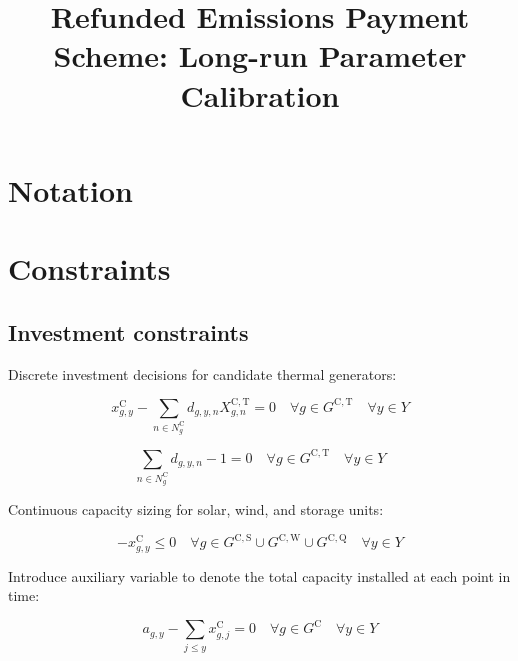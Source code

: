 \documentclass{article}
\title{Refunded Emissions Payment Scheme: Long-run Parameter Calibration}
\newcommand{\sGeneratorsCandidate}{G^{\mathrm{C}}}
\newcommand{\sGeneratorsCandidateThermal}{G^{\mathrm{C,T}}}
\newcommand{\sGeneratorsCandidateWind}{G^{\mathrm{C,W}}}
\newcommand{\sGeneratorsCandidateSolar}{G^{\mathrm{C,S}}}
\newcommand{\sStorageCandidate}{G^{\mathrm{C,Q}}}
\newcommand{\sYears}{Y}
\newcommand{\sInvestmentSizeOptions}{N^{\mathrm{C}}}
\newcommand{\sInvestmentSizeOptionsGenerator}[1][\iGenerator]{\sInvestmentSizeOptions_{#1}}
\newcommand{\iGenerator}{g}
\newcommand{\iYear}{y}
\newcommand{\iYearAlias}{j}
\newcommand{\iInvestmentSizeOption}{n}
\newcommand{\cInvestmentSize}{X^{\mathrm{C,T}}_{\iGenerator,\iInvestmentSizeOption}}
\newcommand{\vInstalledCapacity}[1][\iGenerator,\iYear]{x^{\mathrm{C}}_{#1}}
\newcommand{\vInvestmentSizeIndicator}[1][\iGenerator,\iYear,\iInvestmentSizeOption]{d_{#1}}
\newcommand{\vInstalledCapacityTotal}[1][\iGenerator,\iYear]{a_{#1}}
\begin{document}
	\maketitle
	
\section{Notation}

\section{Constraints}
\subsection{Investment constraints}

Discrete investment decisions for candidate thermal generators:

\begin{equation}
\vInstalledCapacity - \sum\limits_{\iInvestmentSizeOption \in \sInvestmentSizeOptionsGenerator} \vInvestmentSizeIndicator \cInvestmentSize = 0 \quad \forall \iGenerator \in \sGeneratorsCandidateThermal \quad \forall \iYear \in \sYears 
\label{eqn: candidate thermal unit capacity}
\end{equation}

\begin{equation}
\sum\limits_{\iInvestmentSizeOption \in \sInvestmentSizeOptionsGenerator} \vInvestmentSizeIndicator - 1 = 0 \quad \forall \iGenerator \in \sGeneratorsCandidateThermal \quad \forall \iYear \in \sYears
\label{eqn: capacity thermal unit discrete size option - single choice}
\end{equation}

Continuous capacity sizing for solar, wind, and storage units:

\begin{equation}
- \vInstalledCapacity[\iGenerator,\iYear] \leq 0 \quad \forall \iGenerator \in \sGeneratorsCandidateSolar \cup \sGeneratorsCandidateWind \cup \sStorageCandidate \quad \forall \iYear \in \sYears
\label{eqn: non negative investment capacity}
\end{equation}

Introduce auxiliary variable to denote the total capacity installed at each point in time:

\begin{equation}
	\vInstalledCapacityTotal - \sum\limits_{\iYearAlias \leq \iYear} \vInstalledCapacity[\iGenerator,\iYearAlias] = 0 \quad \forall \iGenerator \in \sGeneratorsCandidate \quad \forall \iYear \in \sYears
\end{equation}
\end{document}
